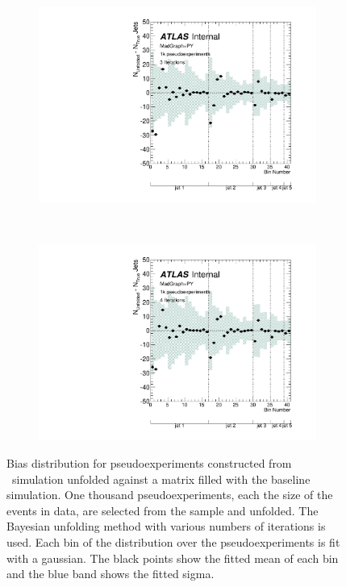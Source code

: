 \begin{figure}
\begin{subfigure}[]{0.5\textwidth}
\includegraphics[width=\textwidth]{fig/Stress/110872atlfast/Bias3Iterations.pdf}
\end{subfigure}
~
\begin{subfigure}[]{0.5\textwidth}
\includegraphics[width=\textwidth]{fig/Stress/110872atlfast/Bias4Iterations.pdf}
\end{subfigure}
\caption{Bias distribution for pseudoexperiments constructed from \madpy\ simulation unfolded against a matrix filled with the baseline simulation. One thousand pseudoexperiments, each the size of the events in data, are selected from the sample and unfolded. The Bayesian unfolding method with various numbers of iterations is used. Each bin of the distribution over the pseudoexperiments is fit with a gaussian. The black points show the fitted mean of each bin and the blue band shows the fitted sigma.}
\label{fig:p8bias}
\end{figure}
